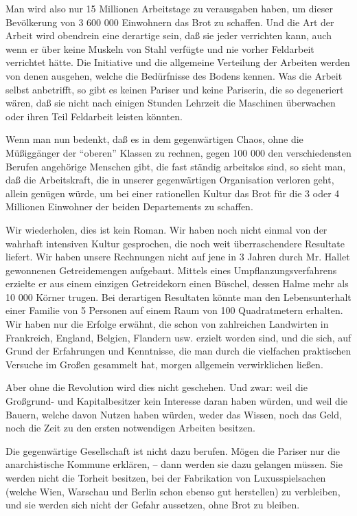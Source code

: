 \documentclass{scrbook}
\begin{document}
Man wird also nur 15 Millionen Arbeitstage zu verausgaben haben, um dieser Bevölkerung von 3 600 000 Einwohnern das Brot zu schaffen. Und die Art der Arbeit wird obendrein eine derartige sein, daß sie jeder verrichten kann, auch wenn er über keine Muskeln von Stahl verfügte und nie vorher Feldarbeit verrichtet hätte. Die Initiative und die allgemeine Verteilung der Arbeiten werden von denen ausgehen, welche die Bedürfnisse des Bodens kennen. Was die Arbeit selbst anbetrifft, so gibt es keinen Pariser und keine Pariserin, die so degeneriert wären, daß sie nicht nach einigen Stunden Lehrzeit die Maschinen überwachen oder ihren Teil Feldarbeit leisten könnten.

Wenn man nun bedenkt, daß es in dem gegenwärtigen Chaos, ohne die Müßiggänger der ``oberen'' Klassen zu rechnen, gegen 100 000 den verschiedensten Berufen angehörige Menschen gibt, die fast ständig arbeitslos sind, so sieht man, daß die Arbeitskraft, die in unserer gegenwärtigen Organisation verloren geht, allein genügen würde, um bei einer rationellen Kultur das Brot für die 3 oder 4 Millionen Einwohner der beiden Departements zu schaffen.

Wir wiederholen, dies ist kein Roman. Wir haben noch nicht einmal von der wahrhaft intensiven Kultur gesprochen, die noch weit überraschendere Resultate liefert. Wir haben unsere Rechnungen nicht auf jene in 3 Jahren durch Mr. Hallet gewonnenen Getreidemengen aufgebaut. Mittels eines Umpflanzungsverfahrens erzielte er aus einem einzigen Getreidekorn einen Büschel, dessen Halme mehr als 10 000 Körner trugen. Bei derartigen Resultaten könnte man den Lebensunterhalt einer Familie von 5 Personen auf einem Raum von 100 Quadratmetern erhalten. Wir haben nur die Erfolge erwähnt, die schon von zahlreichen Landwirten in Frankreich, England, Belgien, Flandern usw. erzielt worden sind, und die sich, auf Grund der Erfahrungen und Kenntnisse, die man durch die vielfachen praktischen Versuche im Großen gesammelt hat, morgen allgemein verwirklichen ließen.

Aber ohne die Revolution wird dies nicht geschehen. Und zwar: weil die Großgrund- und Kapitalbesitzer kein Interesse daran haben würden, und weil die Bauern, welche davon Nutzen haben würden, weder das Wissen, noch das Geld, noch die Zeit zu den ersten notwendigen Arbeiten besitzen.

Die gegenwärtige Gesellschaft ist nicht dazu berufen. Mögen die Pariser nur die anarchistische Kommune erklären, – dann werden sie dazu gelangen müssen. Sie werden nicht die Torheit besitzen, bei der Fabrikation von Luxusspielsachen (welche Wien, Warschau und Berlin schon ebenso gut herstellen) zu verbleiben, und sie werden sich nicht der Gefahr aussetzen, ohne Brot zu bleiben.
\end{document}
